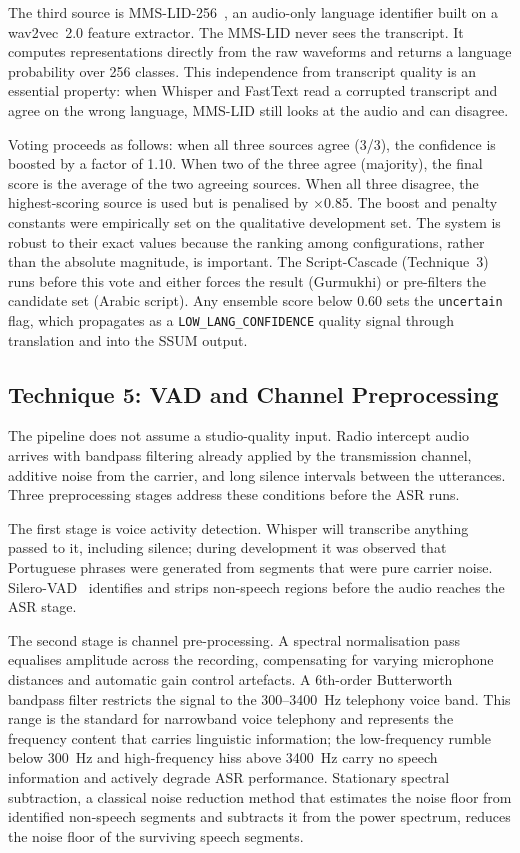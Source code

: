 \documentclass[conference]{IEEEtran}
\begin{document}
The third source is MMS-LID-256~\cite{pratap2023scaling}, an audio-only language identifier built on a wav2vec~2.0 feature extractor. The MMS-LID never sees the transcript. It computes representations directly from the raw waveforms and returns a language probability over 256 classes. This independence from transcript quality is an essential property: when Whisper and FastText read a corrupted transcript and agree on the wrong language, MMS-LID still looks at the audio and can disagree.

Voting proceeds as follows: when all three sources agree (3/3), the confidence is boosted by a factor of 1.10. When two of the three agree (majority), the final score is the average of the two agreeing sources. When all three disagree, the highest-scoring source is used but is penalised by $\times$0.85. The boost and penalty constants were empirically set on the qualitative development set. The system is robust to their exact values because the ranking among configurations, rather than the absolute magnitude, is important. The Script-Cascade (Technique~3) runs before this vote and either forces the result (Gurmukhi) or pre-filters the candidate set (Arabic script). Any ensemble score below 0.60 sets the \texttt{uncertain} flag, which propagates as a \texttt{LOW\_LANG\_CONFIDENCE} quality signal through translation and into the SSUM output.

\subsection{Technique 5: VAD and Channel Preprocessing}

The pipeline does not assume a studio-quality input. Radio intercept audio arrives with bandpass filtering already applied by the transmission channel, additive noise from the carrier, and long silence intervals between the utterances. Three preprocessing stages address these conditions before the ASR runs.

The first stage is voice activity detection. Whisper will transcribe anything passed to it, including silence; during development it was observed that Portuguese phrases were generated from segments that were pure carrier noise. Silero-VAD~\cite{silero2021vad} identifies and strips non-speech regions before the audio reaches the ASR stage.

The second stage is channel pre-processing. A spectral normalisation pass equalises amplitude across the recording, compensating for varying microphone distances and automatic gain control artefacts. A 6th-order Butterworth bandpass filter restricts the signal to the 300--3400~Hz telephony voice band. This range is the standard for narrowband voice telephony and represents the frequency content that carries linguistic information; the low-frequency rumble below 300~Hz and high-frequency hiss above 3400~Hz carry no speech information and actively degrade ASR performance. Stationary spectral subtraction, a classical noise reduction method that estimates the noise floor from identified non-speech segments and subtracts it from the power spectrum, reduces the noise floor of the surviving speech segments.
\end{document}
